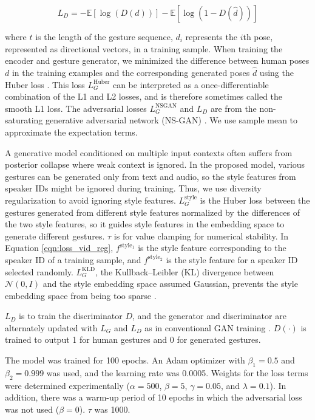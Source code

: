 \documentclass[acmtog]{acmart}
\begin{document}
\begin{equation}
\label{eqn:loss_D}
L_D = -\mathbb{E}[\log(D(d))]-\mathbb{E}[\log(1-D(\hat{d}))]
\end{equation}

\vspace{3mm}
\noindent where $t$ is the length of the gesture sequence, $d_{i}$ represents the $i$th pose, represented as directional vectors, in a training sample. When training the encoder and gesture generator, we minimized the difference between human poses $d$ in the training examples and the corresponding generated poses $\hat{d}$ using the Huber loss \cite{huber1964robust}. This loss $L_G^\textrm{Huber}$ can be interpreted as a once-differentiable combination of the L1 and L2 losses, and is therefore sometimes called the smooth L1 loss. The adversarial losses $L_G^\textrm{NSGAN}$ and $L_D$ are from the non-saturating generative adversarial network (NS-GAN) \cite{goodfellow2014generative}. We use sample mean to approximate the expectation terms.

A generative model conditioned on multiple input contexts often suffers from posterior collapse where weak context is ignored. In the proposed model, various gestures can be generated only from text and audio, so the style features from speaker IDs might be ignored during training. Thus, we use diversity regularization \cite{yang2019diversity} to avoid ignoring style features. $L_G^\textrm{style}$ is the Huber loss between the gestures generated from different style features normalized by the differences of the two style features, so it guides style features in the embedding space to generate different gestures. $\tau$ is for value clamping for numerical stability. In Equation \ref{eqn:loss_vid_reg}, $f^\mathrm{style_1}$ is the style feature corresponding to the speaker ID of a training sample, and $f^\mathrm{style_2}$ is the style feature for a speaker ID selected randomly. $L_G^\textrm{KLD}$, the Kullback–Leibler (KL) divergence between $\mathcal{N}(0, I)$ and the style embedding space assumed Gaussian, prevents the style embedding space from being too sparse \cite{kingma2013auto}.

$L_{D}$ is to train the discriminator $D$, and the generator and discriminator are alternately updated with $L_{G}$ and $L_{D}$ as in conventional GAN training \cite{goodfellow2014generative}. $D(\cdot)$ is trained to output 1 for human gestures and 0 for generated gestures.

The model was trained for 100 epochs. An Adam optimizer with $\beta_1=0.5$ and $\beta_2=0.999$ was used, and the learning rate was 0.0005. Weights for the loss terms were determined experimentally ($\alpha=500$, $\beta=5$, $\gamma=0.05$, and $\lambda=0.1$). In addition, there was a warm-up period of 10 epochs in which the adversarial loss was not used ($\beta=0$). $\tau$ was 1000.
\end{document}
